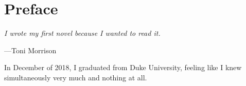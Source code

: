 \newpage


\newlength{\alphabet}


\setcounter{tocdepth}{3} %

\tableofcontents %

\newpage



\part*{Preface}

\begin{displayquote}
\textit{I wrote my first novel because I wanted to read it.}
\begin{flushright}
	---Toni Morrison
\end{flushright}
\vspace{4mm}
\end{displayquote}




In December of 2018, I graduated from Duke University, feeling like I knew simultaneously very much and nothing at all.

